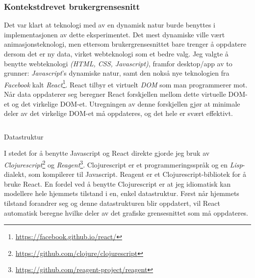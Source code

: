 \subsubsection{Kontekstdrevet brukergrensesnitt}
Det var klart at teknologi med av en dynamisk natur burde benyttes i implementasjonen av dette eksperimentet. Det mest dynamiske ville vært animasjonsteknologi, men ettersom brukergrensesnittet bare trenger å oppdatere dersom det er ny data, virket webteknologi som et bedre valg. Jeg valgte å benytte webteknologi \emph{(HTML, CSS, Javascript)}, framfor desktop/app av to grunner: \emph{Javascript}'s dynamiske natur, samt den nokså nye teknologien fra \emph{Facebook} kalt \emph{React}\footnote{\url{https://facebook.github.io/react/}}. React tilbyr et virtuelt \emph{DOM} som man programmerer mot. Når data oppdaterer seg beregner React forskjellen mellom dette virtuelle DOM-et og det virkelige DOM-et. Utregningen av denne forskjellen gjør at minimale deler av det virkelige DOM-et må oppdateres, og det hele er svært effektivt.
\begin{listing}[ht]
\inputminted[fontsize=\footnotesize, linenos]{clj}{kodesnutter/data.clj}
\caption{Datastruktur}
\label{code:datastructure}
\end{listing}
I stedet for å benytte Javascript og React direkte gjorde jeg bruk av \emph{Clojurescript}\footnote{\url{https://github.com/clojure/clojurescript}} og \emph{Reagent}\footnote{\url{https://github.com/reagent-project/reagent}}. Clojurescript er et programmeringsspråk og en \emph{Lisp}-dialekt, som kompilerer til Javascript. Reagent er et Clojurescript-bibliotek for å bruke React. En fordel ved å benytte Clojurescript er at jeg idiomatisk kan modellere hele hjemmets tilstand i en, enkel datastruktur. Først når hjemmets tilstand forandrer seg og denne datastrukturen blir oppdatert, vil React automatisk beregne hvilke deler av det grafiske grensesnittet som må oppdateres.

